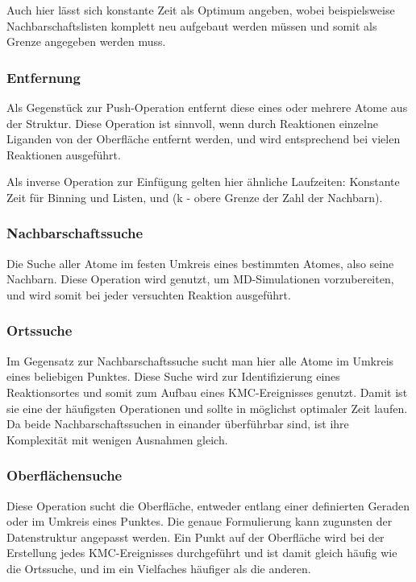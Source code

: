 Auch hier lässt sich konstante Zeit als Optimum angeben, wobei beispielsweise Nachbarschaftslisten komplett neu aufgebaut werden müssen und somit  als Grenze angegeben werden muss.

\subsubsection{Entfernung}
Als Gegenstück zur Push-Operation entfernt diese eines oder mehrere Atome aus der Struktur.
Diese Operation ist sinnvoll, wenn durch Reaktionen einzelne Liganden von der Oberfläche entfernt werden, und wird entsprechend bei vielen Reaktionen ausgeführt.

Als inverse Operation zur Einfügung gelten hier ähnliche Laufzeiten:
Konstante Zeit für Binning und Listen, und  (k - obere Grenze der Zahl der Nachbarn).

\subsubsection{Nachbarschaftssuche}
Die Suche aller Atome im festen Umkreis eines bestimmten Atomes, also seine Nachbarn.
Diese Operation wird genutzt, um MD-Simulationen vorzubereiten, und wird somit bei jeder versuchten Reaktion ausgeführt.

\CONTINUEHERE

\subsubsection{Ortssuche}
Im Gegensatz zur Nachbarschaftssuche sucht man hier alle Atome im Umkreis eines beliebigen Punktes.
Diese Suche wird zur Identifizierung eines Reaktionsortes und somit zum Aufbau eines KMC-Ereignisses genutzt.
Damit ist sie eine der häufigsten Operationen und sollte in möglichst optimaler Zeit laufen.
Da beide Nachbarschaftssuchen in einander überführbar sind, ist ihre Komplexität mit wenigen Ausnahmen gleich.

\subsubsection{Oberflächensuche}
Diese Operation sucht die Oberfläche, entweder entlang einer definierten Geraden oder im Umkreis eines Punktes.
Die genaue Formulierung kann zugunsten der Datenstruktur angepasst werden.
Ein Punkt auf der Oberfläche wird bei der Erstellung jedes KMC-Ereignisses durchgeführt und ist damit gleich häufig wie die Ortssuche, und im ein Vielfaches häufiger als die anderen.

